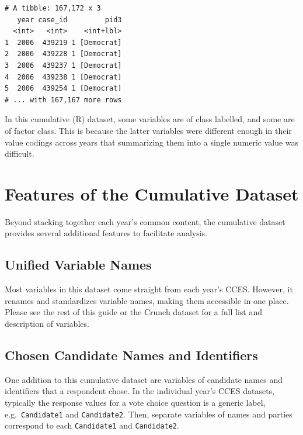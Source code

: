 \documentclass[10pt,article,oneside]{memoir}
\theoremstyle{definition}
\begin{document}
\begin{verbatim}
# A tibble: 167,172 x 3
   year case_id         pid3
  <int>   <int>    <int+lbl>
1  2006  439219 1 [Democrat]
2  2006  439228 1 [Democrat]
3  2006  439237 1 [Democrat]
4  2006  439238 1 [Democrat]
5  2006  439254 1 [Democrat]
# ... with 167,167 more rows
\end{verbatim}

\indent In this cumulative (R) dataset, some variables are of class
labelled, and some are of factor class. This is because the latter
variables were different enough in their value codings across years that
summarizing them into a single numeric value was difficult.

\newpage

\hypertarget{features-of-the-cumulative-dataset}{%
\section{Features of the Cumulative
Dataset}\label{features-of-the-cumulative-dataset}}

Beyond stacking together each year's common content, the cumulative
dataset provides several additional features to facilitate analysis.

\hypertarget{unified-variable-names}{%
\subsection{Unified Variable Names}\label{unified-variable-names}}

Most variables in this dataset come straight from each year's CCES.
However, it renames and standardizes variable names, making them
accessible in one place. Please see the rest of this guide or the Crunch
dataset for a full list and description of variables.

\hypertarget{chosen-candidate-names-and-identifiers}{%
\subsection{Chosen Candidate Names and
Identifiers}\label{chosen-candidate-names-and-identifiers}}

One addition to this cumulative dataset are variables of candidate names
and identifiers that a respondent chose. In the individual year's CCES
datasets, typically the response values for a vote choice question is a
generic label, e.g.~\texttt{Candidate1} and \texttt{Candidate2}. Then,
separate variables of names and parties correspond to each
\texttt{Candidate1} and \texttt{Candidate2}.
\end{document}
